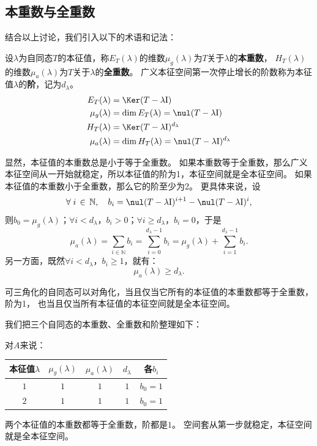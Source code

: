 \documentclass[12pt,UTF8]{ctexbook}
\begin{document}
\subsection{本重数与全重数}
结合以上讨论，我们引入以下的术语和记法：

\begin{df}\label{df:6_4_3}
    设$\lambda$为自同态$T$的本征值，称$E_T(\lambda)$的维数$\mu_g(\lambda)$为$T$关于$\lambda$的\textbf{本重数}，
    $H_T(\lambda)$的维数$\mu_a(\lambda)$为$T$关于$\lambda$的\textbf{全重数}。
    广义本征空间第一次停止增长的阶数称为本征值$\lambda$的\textbf{阶}，记为$d_\lambda$。
    \begin{align*}
        E_T(\lambda) &= \Ker (T - \lambda\mathrm{I})  \\
        \mu_g(\lambda) &= \dim E_T(\lambda) = \nul (T - \lambda\mathrm{I})  \\
        H_T(\lambda) &= \Ker (T - \lambda\mathrm{I})^{d_\lambda}  \\
        \mu_a(\lambda) &= \dim H_T(\lambda) = \nul (T - \lambda\mathrm{I})^{d_\lambda} 
    \end{align*}
\end{df}
显然，本征值的本重数总是小于等于全重数。
如果本重数等于全重数，那么广义本征空间从一开始就稳定，所以本征值的阶为1，本征空间就是全本征空间。
如果本征值的本重数小于全重数，那么它的阶至少为2。
更具体来说，设
$$ \forall \; i\,\in\, \mathbb{N},\quad b_i = \nul (T - \lambda\mathrm{I})^{i+1} - \nul (T - \lambda\mathrm{I})^{i},$$
则$b_0 = \mu_g(\lambda)$；$\forall i<d_{\lambda}$，$b_i>0$；$\forall i\geqslant d_{\lambda}$，$b_i=0$，于是
$$ \mu_a(\lambda) = \sum_{i\in\mathbb{N}} b_i = \sum_{i=0}^{d_{\lambda}-1} b_i = \mu_g(\lambda) + \sum_{i=1}^{d_\lambda-1} b_i.$$
另一方面，既然$\forall i<d_{\lambda}$，$b_i \geqslant 1$，就有：
$$ \mu_a(\lambda) \geqslant d_\lambda.$$

可三角化的自同态可以对角化，当且仅当它所有的本征值的本重数都等于全重数，阶为1，
也当且仅当所有本征值的本征空间就是全本征空间。

我们把三个自同态的本重数、全重数和阶整理如下：

对$A$来说：
\begin{center}
\begin{tabular}{c|c|c|c|c}
本征值$\lambda$ & $\mu_g(\lambda)$ & $\mu_a(\lambda)$ & $d_\lambda$ & 各$b_i$ \\
\hline
$1$ & $1$ & $1$ & $1$ & $b_0 = 1$ \\
$2$ & $1$ & $1$ & $1$ & $b_0 = 1$ \\
\end{tabular}
\end{center}
两个本征值的本重数都等于全重数，阶都是$1$。
空间套从第一步就稳定，本征空间就是全本征空间。
\end{document}
